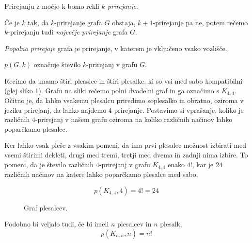 \documentclass[mat1, tisk]{fmfdelo}
\begin{document}
\begin{definicija}
  Prirejanju z močjo k bomo rekli \emph{$k$-prirejanje}.
\end{definicija}


\begin{definicija}
  Če je $k$ tak, 
  da $k$-prirejanje grafa $G$ obstaja, 
  $k+1$-prirejanje pa ne, 
  potem rečemo $k$-prirejanju 
  tudi \emph{največje prirejanje} grafa $G$.
\end{definicija}
\begin{definicija}
  \emph{Popolno prirejaje} grafa je prirejanje, v katerem je vključeno vsako vozlišče.
\end{definicija}

\begin{definicija}
    \emph{$p(G,k)$} označuje število $k$-prirejanj v grafu $G$.
\end{definicija}


\begin{zgled}
    Recimo da imamo štiri pleaslce in štiri plesalke, 
    ki so vsi med sabo kompatibilni (glej sliko \ref{fig:plesisce2}).
    Grafu na sliki rečemo polni dvodelni graf in ga označimo s $K_{4,4}$.
    Očitno je, 
    da lahko vsakemu plesalcu priredimo soplesalko in obratno,
    oziroma v jeziku prirejanj, da lahko najdemo $4$-prirejanje.
    Postavimo si vprašanje, koliko je različnih $4$-prirejanj
    v našem grafu oziroma na koliko različnih načinov lahko 
    poparčkamo plesalce.
    
    Ker lahko vsak pleše z vsakim pomeni, da ima prvi plesalec 
    možnost izbirati med vsemi štirimi dekleti, drugi med tremi, tretji med dvema
    in zadnji nima izbire.
    To pomeni, da je število različnih $4$-prirejanj v grafu $K_{4,4}$
    enako $4!$, kar je $24$ različnih načinov na katere lahko poparčkamo
    plesalce med sabo.

    $$p(K_{4,4},4) = 4! = 24$$

\begin{figure} [H]
    \begin{center}
  
      
      \label{fig:plesisce2}
      \caption{Graf plesalcev.}
    \end{center}
  \end{figure}

  Podobno bi veljalo tudi, če bi imeli $n$ plesalcev
  in $n$ plesalk. 
  $$p(K_{n,n},n) = n! $$
\end{zgled}
\end{document}
